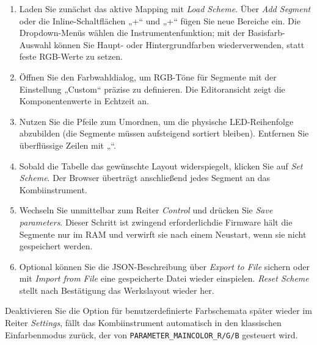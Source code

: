 \begin{enumerate}
    \item Laden Sie zunächst das aktive Mapping mit \emph{Load Scheme}. Über \emph{Add Segment} oder die Inline-Schaltflächen „+\textuparrow{}“ und „+\textdownarrow{}“ fügen Sie neue Bereiche ein. Die Dropdown-Menüs wählen die Instrumentenfunktion; mit der Basisfarb-Auswahl können Sie Haupt- oder Hintergrundfarben wiederverwenden, statt feste RGB-Werte zu setzen.
    \item Öffnen Sie den Farbwahldialog, um RGB-Töne für Segmente mit der Einstellung „Custom“ präzise zu definieren. Die Editoransicht zeigt die Komponentenwerte in Echtzeit an.
    \item Nutzen Sie die Pfeile zum Umordnen, um die physische LED-Reihenfolge abzubilden (die Segmente müssen aufsteigend sortiert bleiben). Entfernen Sie überflüssige Zeilen mit „\texttimes{}“.
    \item Sobald die Tabelle das gewünschte Layout widerspiegelt, klicken Sie auf \emph{Set Scheme}. Der Browser überträgt anschließend jedes Segment an das Kombiinstrument.
    \item Wechseln Sie unmittelbar zum Reiter \emph{Control} und drücken Sie \emph{Save parameters}. Dieser Schritt ist zwingend erforderlich\textemdash{}die Firmware hält die Segmente nur im RAM und verwirft sie nach einem Neustart, wenn sie nicht gespeichert werden.
    \item Optional können Sie die JSON-Beschreibung über \emph{Export to File} sichern oder mit \emph{Import from File} eine gespeicherte Datei wieder einspielen. \emph{Reset Scheme} stellt nach Bestätigung das Werkslayout wieder her.
\end{enumerate}

Deaktivieren Sie die Option für benutzerdefinierte Farbschemata später wieder im Reiter \emph{Settings}, fällt das Kombiinstrument automatisch in den klassischen Einfarbenmodus zurück, der von \verb|PARAMETER_MAINCOLOR_R/G/B| gesteuert wird.
